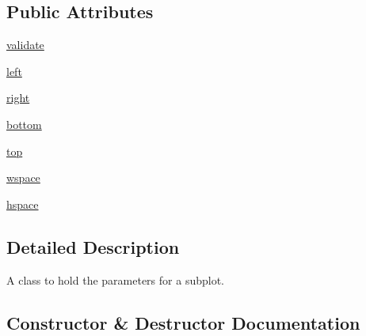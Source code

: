 \subsection*{Public Attributes}
\begin{DoxyCompactItemize}
\item 
\hyperlink{classmatplotlib_1_1figure_1_1SubplotParams_af5cb107c157513212df910a24e22a14a}{validate}
\item 
\hyperlink{classmatplotlib_1_1figure_1_1SubplotParams_aeb896b8ae56f68aada9338f394e80693}{left}
\item 
\hyperlink{classmatplotlib_1_1figure_1_1SubplotParams_af8c3bd90d87372678adcedfc3538d0a2}{right}
\item 
\hyperlink{classmatplotlib_1_1figure_1_1SubplotParams_a8f8adf624143b057e6ab108e3e1cac17}{bottom}
\item 
\hyperlink{classmatplotlib_1_1figure_1_1SubplotParams_a1b64e11c2d7e445073c52b3c508de2ca}{top}
\item 
\hyperlink{classmatplotlib_1_1figure_1_1SubplotParams_a2ccba74a52f1e7a9160a8d331d95c30b}{wspace}
\item 
\hyperlink{classmatplotlib_1_1figure_1_1SubplotParams_a110507b89d5bc6d1d04ab28a6be122d9}{hspace}
\end{DoxyCompactItemize}


\subsection{Detailed Description}
\begin{DoxyVerb}A class to hold the parameters for a subplot.
\end{DoxyVerb}
 

\subsection{Constructor \& Destructor Documentation}
\mbox{\label{classmatplotlib_1_1figure_1_1SubplotParams_ad197131d70e8c8deeea4619f551a392a}} 

